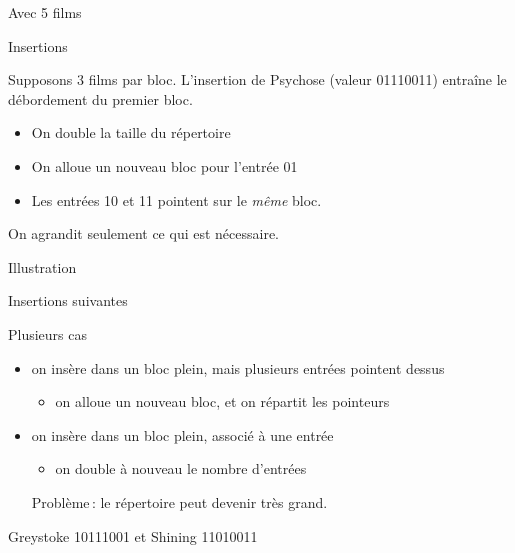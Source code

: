 \begin{frame}{Avec 5 films}


\end{frame}
\begin{frame}{Insertions}

Supposons 3 films par bloc. L'insertion de Psychose
(valeur 01110011) entraîne le débordement du premier bloc.

\begin{itemize}
  \item On double la taille du répertoire
  \item On alloue un nouveau bloc pour l'entrée 01
  \item Les entrées 10 et 11 pointent sur le \textit{même} bloc.
\end{itemize}
On agrandit seulement ce qui est nécessaire.

\end{frame}
\begin{frame}{Illustration}


\end{frame}
\begin{frame}{Insertions suivantes}

Plusieurs cas
\begin{itemize}
  \item on insère dans un bloc plein, mais plusieurs
           entrées pointent dessus
  \begin{itemize}
    \item on alloue un nouveau bloc, et on répartit les pointeurs
  \end{itemize}
  \item on insère dans un bloc plein, associé à une entrée
  \begin{itemize}
    \item on double à nouveau le nombre d'entrées
  \end{itemize}
Problème\,: le répertoire peut devenir très grand.
\end{itemize}

\end{frame}
\begin{frame}{Greystoke 10111001 et Shining 11010011}


\end{frame}



